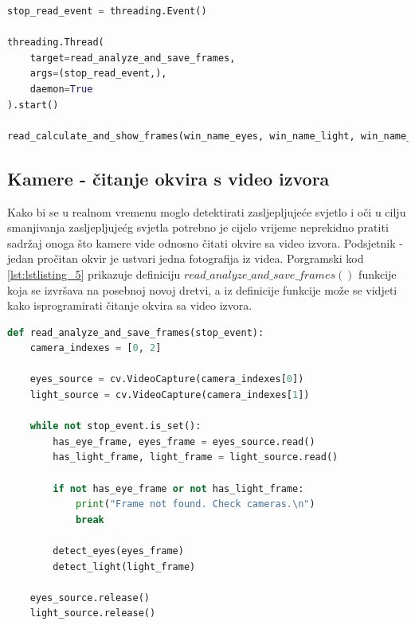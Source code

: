 \documentclass{foi}
\begin{document}
\begin{lstlisting}[language=Python, label={lst:lstlisting_4}, firstnumber=151, style=colored, caption={Inicijaliziranje dretvenog događaja $stop\_read\_event$, stvaranje i pokretanje nove dretve i pozivanje funkcije $read\_analyze\_and\_save\_frames()$ u glavnoj dretvi}]
stop_read_event = threading.Event()

threading.Thread(
    target=read_analyze_and_save_frames,
    args=(stop_read_event,),
    daemon=True
).start()

read_calculate_and_show_frames(win_name_eyes, win_name_light, win_name_protection)
\end{lstlisting}

\subsection{Kamere - čitanje okvira s video izvora}

Kako bi se u realnom vremenu moglo detektirati zasljepljujeće svjetlo i oči u cilju smanjivanja zasljepljujećg svjetla potrebno je cijelo vrijeme neprekidno pratiti sadržaj onoga što kamere vide odnosno čitati okvire sa video izvora. Podsjetnik - jedan pročitan okvir je ustvari jedna fotografija iz videa. Porgramski kod \ref{lst:lstlisting_5} prikazuje definiciju $read\_analyze\_and\_save\_frames()$ funkcije koja se izvršava na posebnoj novoj dretvi, a iz definicije funkcije može se vidjeti kako isprogramirati čitanje okvira sa video izvora.

\begin{lstlisting}[language=Python, label={lst:lstlisting_5}, firstnumber=13, style=colored, caption={Definicija funkcije $read\_analyze\_and\_save\_frames()$}]
def read_analyze_and_save_frames(stop_event):
    camera_indexes = [0, 2]

    eyes_source = cv.VideoCapture(camera_indexes[0])
    light_source = cv.VideoCapture(camera_indexes[1])

    while not stop_event.is_set():
        has_eye_frame, eyes_frame = eyes_source.read()
        has_light_frame, light_frame = light_source.read()

        if not has_eye_frame or not has_light_frame:
            print("Frame not found. Check cameras.\n")
            break

        detect_eyes(eyes_frame)
        detect_light(light_frame)

    eyes_source.release()
    light_source.release()
\end{lstlisting}
\end{document}
